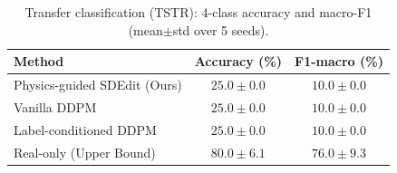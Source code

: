 \begin{table}[t]
\centering
\caption{Transfer classification (TSTR): 4-class accuracy and macro-F1 (mean$\pm$std over 5 seeds).}
\label{tab:tstr}
\begin{tabular}{lcc}
\hline
Method & Accuracy (\%) & F1-macro (\%) \\
\hline
Physics-guided SDEdit (Ours) & $25.0 \pm 0.0$ & $10.0 \pm 0.0$ \\
Vanilla DDPM & $25.0 \pm 0.0$ & $10.0 \pm 0.0$ \\
Label-conditioned DDPM & $25.0 \pm 0.0$ & $10.0 \pm 0.0$ \\
Real-only (Upper Bound) & $\mathbf{80.0 \pm 6.1}$ & $\mathbf{76.0 \pm 9.3}$ \\
\hline
\end{tabular}
\end{table}

